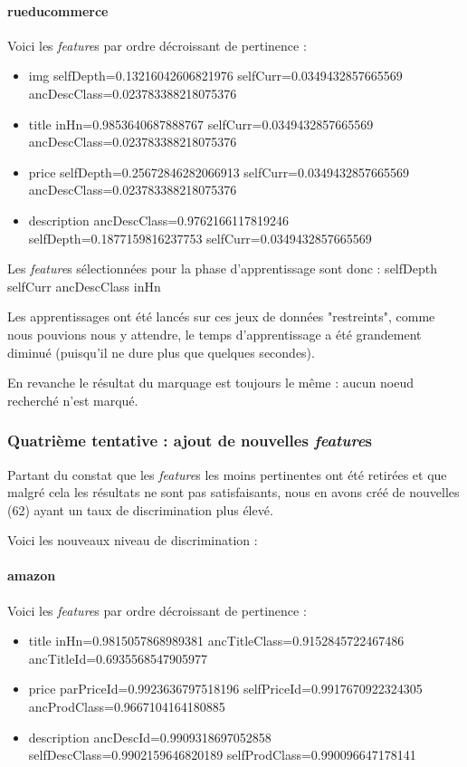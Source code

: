\documentclass{article}
\begin{document}
\paragraph{rueducommerce}
Voici les \emph{feature}s par ordre décroissant de pertinence :
\begin{itemize}
    \item{img} selfDepth=0.13216042606821976 selfCurr=0.0349432857665569 ancDescClass=0.023783388218075376
    \item{title} inHn=0.9853640687888767 selfCurr=0.0349432857665569 ancDescClass=0.023783388218075376
    \item{price} selfDepth=0.25672846282066913 selfCurr=0.0349432857665569 ancDescClass=0.023783388218075376
    \item{description} ancDescClass=0.9762166117819246 selfDepth=0.1877159816237753 selfCurr=0.0349432857665569
\end{itemize}

Les \emph{feature}s sélectionnées pour la phase d'apprentissage sont donc :
selfDepth selfCurr ancDescClass inHn

Les apprentissages ont été lancés sur ces jeux de données "restreints", comme nous
pouvions nous y attendre, le temps d'apprentissage a été grandement diminué (puisqu'il
ne dure plus que quelques secondes).

En revanche le résultat du marquage est toujours le même : aucun noeud recherché n'est
marqué.

\subsubsection{Quatrième tentative : ajout de nouvelles \emph{feature}s}
Partant du constat que les \emph{feature}s les moins pertinentes ont été retirées
et que malgré cela les résultats ne sont pas satisfaisants, nous en avons créé de
nouvelles (62) ayant un taux de discrimination plus élevé.

Voici les nouveaux niveau de discrimination :

\paragraph{amazon}
Voici les \emph{feature}s par ordre décroissant de pertinence :
\begin{itemize}
    \item{title} inHn=0.9815057868989381 ancTitleClass=0.9152845722467486 ancTitleId=0.6935568547905977
    \item{price} parPriceId=0.9923636797518196 selfPriceId=0.9917670922324305 ancProdClass=0.9667104164180885
    \item{description} ancDescId=0.9909318697052858 selfDescClass=0.9902159646820189 selfProdClass=0.990096647178141
\end{itemize}
\end{document}
